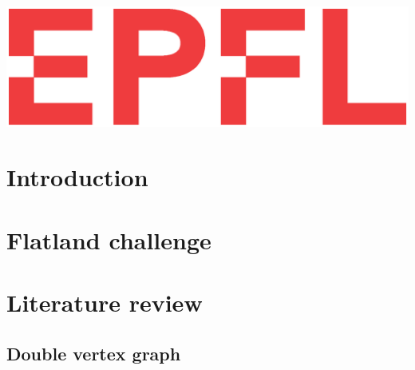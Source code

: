 \documentclass[14pt,a4paper]{article}
\theoremstyle{definition}
\numberwithin{equation}{subsection}
\begin{document}
\begin{titlepage}

 \includegraphics[width=0.5\linewidth]{img/logo.eps}\\[1cm] %
 

\vfill %


\end{titlepage}




\newpage





\tableofcontents
{}
\newpage






\section{Introduction}





\newpage
\section{Flatland challenge}

\newpage

\section{Literature review}
\subsection{Double vertex graph}
\end{document}

